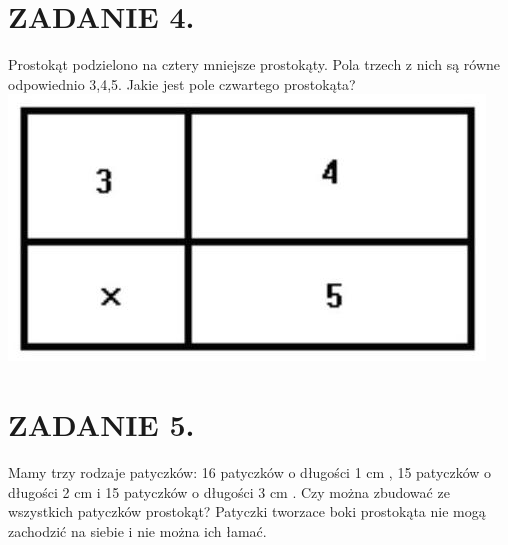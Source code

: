\documentclass[10pt]{article}
\begin{document}
\section*{ZADANIE 4.}
Prostokąt podzielono na cztery mniejsze prostokąty. Pola trzech z nich są równe odpowiednio 3,4,5. Jakie jest pole czwartego prostokąta?\\
\includegraphics[max width=\textwidth, center]{2024_11_21_5747135af9543a0e0c7fg-1}

\section*{ZADANIE 5.}
Mamy trzy rodzaje patyczków: 16 patyczków o długości 1 cm , 15 patyczków o długości 2 cm i 15 patyczków o długości 3 cm . Czy można zbudować ze wszystkich patyczków prostokąt? Patyczki tworzace boki prostokąta nie mogą zachodzić na siebie i nie można ich łamać.
\end{document}
